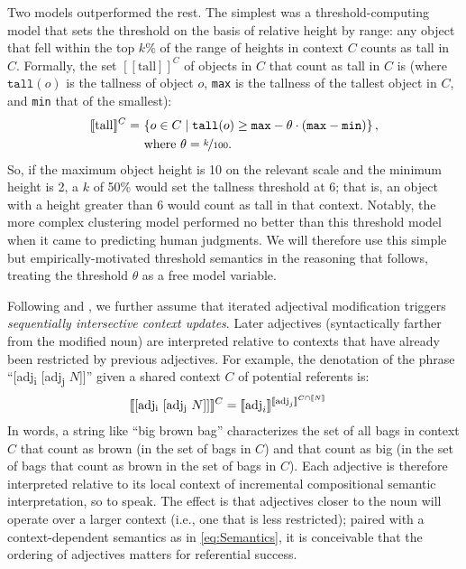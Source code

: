 \documentclass[10pt,a4paper]{article}
\newcommand{\den}[1]{\ensuremath{[\![#1]\!]}}
\begin{document}
Two models outperformed the rest. The simplest was a threshold-computing model that sets the threshold on the basis of relative height by range: any object that fell within the top $k\%$ of the range of heights in context $C$ counts as tall in $C$. Formally, the set $\den{\text{tall}}^C$ of objects in $C$ that count as tall in $C$ is (where $\texttt{tall}(o)$ is the tallness of object $o$, \texttt{max} is the tallness of the tallest object in $C$, and \texttt{min} that of the smallest):
\begin{align}
  \label{eq:Semantics}
  \den{\text{tall}}^C  = & \ \{ o \in C \mid \texttt{tall}(o) \ge \texttt{max} - \theta \cdot (\texttt{max} - \texttt{min}) \} \,, \\
  & \text{ where $\theta = \nicefrac{k}{100}$.} \nonumber
\end{align}
So, if the maximum object height is 10 on the relevant scale and the minimum height is 2, a $k$ of 50\% would set the tallness threshold at 6; that is, an object with a height greater than 6 would count as tall in that context. Notably, the more complex clustering model performed no better than this threshold model when it came to predicting human judgments. We will therefore use this simple but empirically-motivated threshold semantics in the reasoning that follows, treating the threshold $\theta$ as a free model variable.

Following  and , we further assume that iterated adjectival modification triggers \emph{sequentially intersective context updates}. Later adjectives (syntactically farther from the modified noun) are interpreted relative to contexts that have already been restricted by previous adjectives. For example, the denotation of the phrase ``[adj\textsubscript{i} [adj\textsubscript{j} $N$]]'' given a shared context $C$ of potential referents is:
\begin{align}
  \label{eq:SequentialInterpretation}
  \den{\text{[adj\textsubscript{i} [adj\textsubscript{j} $N$]]}}^{C} & = \den{\text{adj}_i}^{\den{\text{adj}_j}^{C\cap \den{N}}} 
\end{align} 
In words, a string like ``big brown bag'' characterizes the set of all bags in context $C$ that count as brown (in the set of bags in $C$) and that count as big (in the set of bags that count as brown in the set of bags in $C$). Each adjective is therefore interpreted relative to its local context of incremental compositional semantic interpretation, so to speak. The effect is that adjectives closer to the noun will operate over a larger context (i.e., one that is less restricted); paired with a context-dependent semantics as in \eqref{eq:Semantics}, it is conceivable that the ordering of adjectives matters for referential success.
\end{document}
